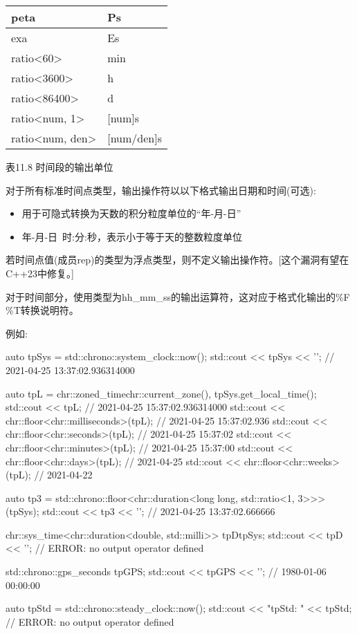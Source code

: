 \begin{longtable}[c]{|l|l|}
peta                                   & Ps                     \\ \hline
exa                                    & Es                     \\ \hline
ratio\textless{}60\textgreater{}       & min                    \\ \hline
ratio\textless{}3600\textgreater{}     & h                      \\ \hline
ratio\textless{}86400\textgreater{}    & d                      \\ \hline
ratio\textless{}num, 1\textgreater{}   & {[}num{]}s             \\ \hline
ratio\textless{}num, den\textgreater{} & {[}num/den{]}s         \\ \hline
\end{longtable}

\begin{center}
表11.8 时间段的输出单位
\end{center}

对于所有标准时间点类型，输出操作符以以下格式输出日期和时间(可选):

\begin{itemize}
\item 
用于可隐式转换为天数的积分粒度单位的“年-月-日”

\item 
年-月-日\ 时:分:秒，表示小于等于天的整数粒度单位
\end{itemize}

若时间点值(成员rep)的类型为浮点类型，则不定义输出操作符。[这个漏洞有望在C++23中修复。]

对于时间部分，使用类型为hh\_mm\_ss的输出运算符，这对应于格式化输出的\%F \%T转换说明符。

例如:

\begin{cpp}
auto tpSys = std::chrono::system_clock::now();
std::cout << tpSys << '\n'; // 2021-04-25 13:37:02.936314000

auto tpL = chr::zoned_time{chr::current_zone(), tpSys}.get_local_time();
std::cout << tpL; // 2021-04-25 15:37:02.936314000
std::cout << chr::floor<chr::milliseconds>(tpL); // 2021-04-25 15:37:02.936
std::cout << chr::floor<chr::seconds>(tpL); // 2021-04-25 15:37:02
std::cout << chr::floor<chr::minutes>(tpL); // 2021-04-25 15:37:00
std::cout << chr::floor<chr::days>(tpL); // 2021-04-25
std::cout << chr::floor<chr::weeks>(tpL); // 2021-04-22

auto tp3 = std::chrono::floor<chr::duration<long long, std::ratio<1, 3>>>(tpSys);
std::cout << tp3 << '\n'; // 2021-04-25 13:37:02.666666

chr::sys_time<chr::duration<double, std::milli>> tpD{tpSys};
std::cout << tpD << '\n'; // ERROR: no output operator defined

std::chrono::gps_seconds tpGPS;
std::cout << tpGPS << '\n'; // 1980-01-06 00:00:00

auto tpStd = std::chrono::steady_clock::now();
std::cout << "tpStd: " << tpStd; // ERROR: no output operator defined
\end{cpp}

